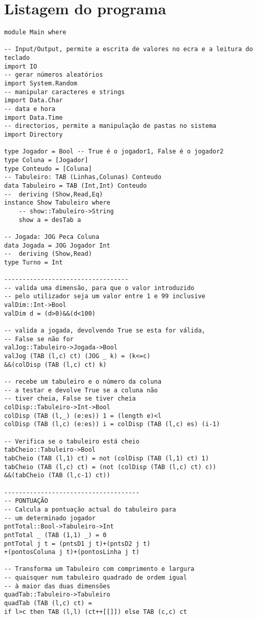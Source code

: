 \documentclass[a4paper,titlepage]{scrreprt}
\begin{document}
	\section{Listagem do programa}
	\begin{verbatim}
module Main where

-- Input/Output, permite a escrita de valores no ecra e a leitura do teclado
import IO
-- gerar números aleatórios
import System.Random
-- manipular caracteres e strings
import Data.Char		
-- data e hora
import Data.Time
-- directorios, permite a manipulação de pastas no sistema
import Directory		

type Jogador = Bool	-- True é o jogador1, False é o jogador2
type Coluna = [Jogador]
type Conteudo = [Coluna]
-- Tabuleiro: TAB (Linhas,Colunas) Conteudo
data Tabuleiro = TAB (Int,Int) Conteudo
--	deriving (Show,Read,Eq)
instance Show Tabuleiro where
	-- show::Tabuleiro->String
	show a = desTab a
	
-- Jogada: JOG Peca Coluna
data Jogada = JOG Jogador Int
--	deriving (Show,Read)
type Turno = Int

----------------------------------
-- valida uma dimensão, para que o valor introduzido
-- pelo utilizador seja um valor entre 1 e 99 inclusive
valDim::Int->Bool
valDim d = (d>0)&&(d<100)

-- valida a jogada, devolvendo True se esta for válida,
-- False se não for
valJog::Tabuleiro->Jogada->Bool
valJog (TAB (l,c) ct) (JOG _ k) = (k<=c)
&&(colDisp (TAB (l,c) ct) k)

-- recebe um tabuleiro e o número da coluna
-- a testar e devolve True se a coluna não
-- tiver cheia, False se tiver cheia
colDisp::Tabuleiro->Int->Bool
colDisp (TAB (l,_) (e:es)) 1 = (length e)<l
colDisp (TAB (l,c) (e:es)) i = colDisp (TAB (l,c) es) (i-1)

-- Verifica se o tabuleiro está cheio
tabCheio::Tabuleiro->Bool
tabCheio (TAB (l,1) ct) = not (colDisp (TAB (l,1) ct) 1)
tabCheio (TAB (l,c) ct) = (not (colDisp (TAB (l,c) ct) c))
&&(tabCheio (TAB (l,c-1) ct))

-------------------------------------
-- PONTUAÇÃO
-- Calcula a pontuação actual do tabuleiro para
-- um determinado jogador
pntTotal::Bool->Tabuleiro->Int
pntTotal _ (TAB (1,1) _) = 0
pntTotal j t = (pntsD1 j t)+(pntsD2 j t)
+(pontosColuna j t)+(pontosLinha j t)

-- Transforma um Tabuleiro com comprimento e largura
-- quaisquer num tabuleiro quadrado de ordem igual
-- à maior das duas dimensões
quadTab::Tabuleiro->Tabuleiro
quadTab (TAB (l,c) ct) =
if l>c then TAB (l,l) (ct++[[]]) else TAB (c,c) ct


\end{verbatim}
\end{document}
